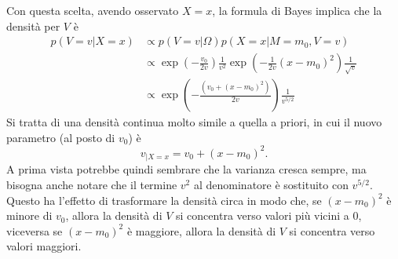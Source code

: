 \documentclass[
  italian,
  letterpaper,
]{book}
\newcommand{\bra}[1]{\left( #1 \right)}
\theoremstyle{definition}
\theoremstyle{remark}
\begin{document}
Con questa scelta, avendo osservato \(X=x\), la formula di Bayes implica
che la densità per \(V\) è
\[ \begin{split} p(V=v| X=x) & \propto p(V=v|\Omega ) p(X =x | M=m_0, V=v) \\
& \propto \exp\bra{ - \frac{v_0}{2v} } \frac 1 {v^2} \exp\bra{-\frac 1 {2v}  (x-m_0)^2 } \frac{1}{\sqrt{v}}\\
&\propto\exp\bra{ - \frac{ \bra{v_0 + (x-m_0)^2} } {2v}} \frac{1}{v^{5/2}}\end{split}\]
Si tratta di una densità continua molto simile a quella a priori, in cui
il nuovo parametro (al posto di \(v_0\)) è
\[ v_{|X=x} = v_0 + (x-m_0)^2.\] A prima vista potrebbe quindi sembrare
che la varianza cresca sempre, ma bisogna anche notare che il termine
\(v^2\) al denominatore è sostituito con \(v^{5/2}\). Questo ha
l'effetto di trasformare la densità circa in modo che, se \((x-m_0)^2\)
è minore di \(v_0\), allora la densità di \(V\) si concentra verso
valori più vicini a \(0\), viceversa se \((x-m_0)^2\) è maggiore, allora
la densità di \(V\) si concentra verso valori maggiori.
\end{document}
